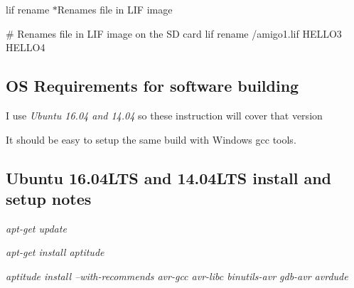 \begin{DoxyItemize}
\begin{DoxyItemize}
\begin{DoxyPre}
\begin{DoxyItemize}
\begin{DoxyItemize}
\end{DoxyItemize}
\item lif rename $\ast$\+Renames file in L\+IF image 
\begin{DoxyPre}
         \# Renames file in LIF image on the SD card
         lif rename /amigo1.lif HELLO3 HELLO4
      \end{DoxyPre}
 


\end{DoxyItemize}\end{DoxyPre}

\end{DoxyItemize}
\end{DoxyItemize}


\begin{DoxyPre}\subsection*{OS Requirements for software building}\end{DoxyPre}



\begin{DoxyPre}
\begin{DoxyItemize}
\item I use {\itshape Ubuntu 16.04 and 14.04} so these instruction will cover that version
\item It should be easy to setup the same build with Windows gcc tools.
\end{DoxyItemize}\end{DoxyPre}



\begin{DoxyPre}\subsection*{Ubuntu 16.04LTS and 14.04LTS install and setup notes}\end{DoxyPre}



\begin{DoxyPre}
\begin{DoxyItemize}
\item {\itshape apt-get update}
\item {\itshape apt-get install aptitude}
\item {\itshape aptitude install --with-recommends avr-gcc avr-libc binutils-avr gdb-avr avrdude}
\end{DoxyItemize}\end{DoxyPre}



